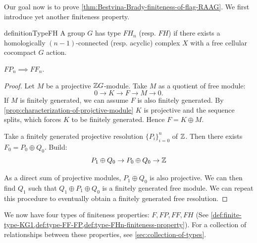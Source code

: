 Our goal now is to prove \cref{thm:Bestvina-Brady-finiteness-of-flag-RAAG}. We first introduce yet another finiteness property.

\begin{restatable}{definition}{TypeFH}
    \label{def:type-FHn-finiteness-property}
    A group \(G\) has type \(FH_n\) (resp. \(FH\)) if there exists a homologically \((n-1)\)-connected (resp. acyclic) complex \(X\) with a free cellular cocompact \(G\) action.
\end{restatable}


\begin{lemma}
    \label{lem:FPn-implies-FFn}
    \(FP_n \implies FF_n\).
\end{lemma}
\begin{proof}
    Let \(M\) be a projective \(\mathbb{Z} G\)-module.
    Take \(M\) as a quotient of free module:
    \[ 0 \to K \to F \to M \to 0 . \]
    If \(M\) is finitely generated, we can assume \(F\) is also finitely generated. By \cref{prop:characterization-of-projctive-module} \(K\) is projective and the sequence splits, which forces \(K\) to be finitely generated. Hence \(F=K\oplus M\).

    Take a finitely generated projective resolution \(\{P_i\}_{i=0}^n\)  of \(\mathbb{Z}\). Then there exists \(F_0 =P_0\oplus Q_0\). Build:
    \[ P_1\oplus Q_0 \to P_0 \oplus Q_0 \to \mathbb{Z} \]

    As a direct sum of projective modules, \(P_1 \oplus Q_0\) is also projective. We can then find \(Q_1\) such that \(Q_1 \oplus P_1\oplus Q_0 \) is a finitely generated free module. We can repeat this procedure to eventually obtain a finitely generated free resolution.
\end{proof}


We now have four types of finiteness properties: \(F, FP, FF, FH \) (See \cref{def:finite-type-KG1,def:type-FF-FP,def:type-FHn-finiteness-property}).  For a collection of relationships between these properties, see \cref{sec:collection-of-types}.

